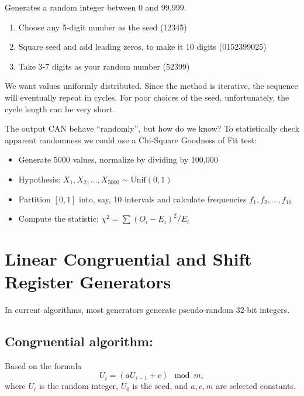 \documentclass[captions=tableheading]{scrbook}
\begin{document}
Generates a random integer between 0 and 99,999.


\begin{enumerate}
\item Choose any 5-digit number as the seed (12345)
\item Square seed and add leading zeros, to make it 10 digits (0152399025)
\item Take 3-7 digits as your random number (52399)
\end{enumerate}

We want values uniformly distributed. Since the method is iterative, the sequence will eventually repeat in cycles. For poor choices of the seed, unfortunately, the cycle length can be very short.

The output CAN behave ``randomly'', but how do we know? To statistically check apparent randomness we could use a Chi-Square Goodness of Fit test:

\begin{itemize}
\item Generate 5000 values, normalize by dividing by 100,000
\item Hypothesis: $X_{1},X_{2},\ldots,X_{5000}\sim\mathrm{Unif}(0,1)$
\item Partition \( [0,1] \) into, say, 10 intervals and calculate frequencies $f_{1},f_{2},\ldots,f_{10}$
\item Compute the statistic: $\chi^{2}=\sum(O_{i}-E_{i})^{2}/E_{i}$
\end{itemize}
\section{Linear Congruential and Shift Register Generators}
\label{sec-2_2}


In current algorithms, most generators generate pseudo-random 32-bit integers.  
\subsection{Congruential algorithm:}
\label{sec-2_2_1}

Based on the formula 
\[
U_{i}=(aU_{i-1}+c)\mod m,
\]
where $U_{i}$ is the random integer, $U_{0}$ is the seed, and $a,c,m$ are selected constants.
\end{document}

